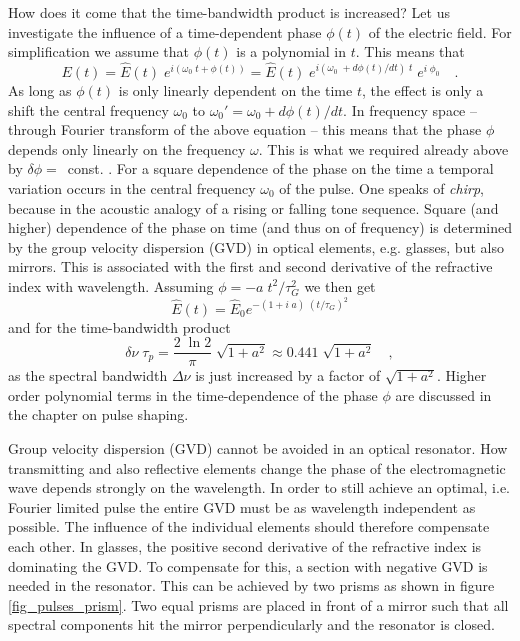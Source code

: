 How does it come that the time-bandwidth product is increased? 
Let us investigate the  influence of a time-dependent phase $\phi(t)$
of the electric field. For simplification we 
assume that $\phi(t)$ is a polynomial in $t$. This means that
\begin{equation}
  E(t) = \hat{E}(t) \; e^{i ( \omega_0 \; t + \phi(t))}
  = \hat{E}(t) \; e^{i ( \omega_0 \; + d\phi(t)/dt) \; t} \; e^{i
  \; \phi_0}  \quad . \label{gl_theo_nlo_ml_field_with_phase}
\end{equation}
As long as $\phi(t)$ is only linearly dependent on the time $t$, the effect is
 only a shift the central frequency $\omega_0$ to
$\omega_0' = \omega_0 + d\phi(t)/dt$.  In frequency space -- through
Fourier transform of the above equation --  this means that the
phase $\phi$ depends only linearly on the frequency $\omega$. This
is what we required already above by  
$\delta \phi =$~const. . For a square
dependence of the phase on the time a temporal variation occurs
in the central frequency $\omega_0$ of the pulse. One  speaks
of \emph{chirp}, because in the acoustic analogy of a
rising or falling tone sequence. Square
(and higher) dependence of the phase on time (and thus on
of frequency) is determined by the group velocity dispersion
(GVD) in optical elements,
e.g. glasses, but also mirrors. This is associated with the
first and second derivative of the refractive index with 
wavelength. Assuming $\phi = - a \;
t^2 / \tau_G^2$ we then get
\begin{equation}
  \hat{E}(t) = \hat{E}_0 e^{- (1 + i \; a) \; ( t / \tau_G ) ^2}
\end{equation}
and for the time-bandwidth product
\begin{equation}
  \delta \nu \; \tau_p = \frac{2 \; \ln 2}{\pi} \; \sqrt{1 + a^2} \approx
  0.441 \; \sqrt{1 + a^2} \quad ,
\end{equation}
as the spectral bandwidth $\Delta \nu$ is just increased by a factor of
$\sqrt{1 + a^2}$. Higher order polynomial terms in the time-dependence of the phase $\phi$ are discussed in the chapter on  pulse shaping.






Group velocity dispersion (GVD) cannot be avoided  in an
optical resonator. How transmitting and
also reflective elements change the phase of the
electromagnetic wave  depends strongly on the wavelength. In order to still achieve an optimal, i.e. Fourier limited pulse
the entire GVD must be as wavelength independent as possible. The influence of the individual elements should therefore 
compensate  each other. In glasses, the positive second derivative of the refractive index
is dominating  the GVD. To compensate for this, a section with
negative GVD is needed in the resonator. This can be  achieved by two prisms as shown in figure
\ref{fig_pulses_prism}. Two equal
prisms are placed in front of a mirror such 
that all spectral components hit the mirror perpendicularly
and  the resonator is closed.  

